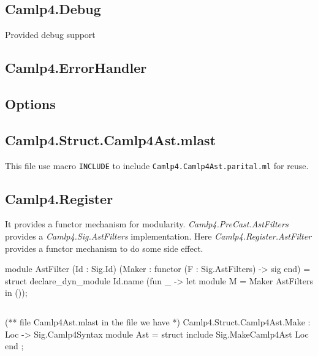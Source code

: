 \subsection{Camlp4.Debug}
\label{sec:Camlp4.Debug}

Provided debug support  

\subsection{Camlp4.ErrorHandler}
\label{sec:ErrorHandler}

\subsection{Options}
\label{sec:Options}


\subsection{Camlp4.Struct.Camlp4Ast.mlast} 

This file use macro \verb|INCLUDE| to include
\verb|Camlp4.Camlp4Ast.parital.ml| for reuse.


\subsection{Camlp4.Register}
It provides a functor mechanism for modularity.
\textit{Camlp4.PreCast.AstFilters} provides a
\textit{Camlp4.Sig.AstFilters} implementation. Here
\textit{Camlp4.Register.AstFilter} provides a functor mechanism
to do some side effect.

\begin{ocamlcode}
module AstFilter
  (Id : Sig.Id) (Maker : functor (F : Sig.AstFilters) -> sig end) =
struct
  declare_dyn_module Id.name (fun _ -> let module M = Maker AstFilters in ());
\end{ocamlcode}

\inputminted[fontsize=\scriptsize,]{ocaml}{code/camlp4/source/AstFilters.ml}



\begin{ocamlcode}
(** file Camlp4Ast.mlast   in the file we have *)
Camlp4.Struct.Camlp4Ast.Make : Loc -> Sig.Camlp4Syntax
  module Ast = struct
     include Sig.MakeCamlp4Ast Loc 
  end ;
\end{ocamlcode}


